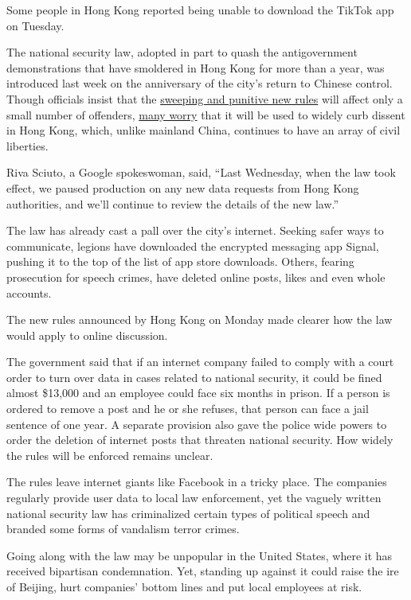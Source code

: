 Some people in Hong Kong reported being unable to download the TikTok
app on Tuesday.

The national security law, adopted in part to quash the antigovernment
demonstrations that have smoldered in Hong Kong for more than a year,
was introduced last week on the anniversary of the city's return to
Chinese control. Though officials insist that the
\href{https://www.nytimes.com/2020/07/02/world/asia/hong-kong-security-china.html}{sweeping
and punitive new rules} will affect only a small number of offenders,
\href{https://www.nytimes.com/2020/07/05/world/asia/hong-kong-security-law.html}{many
worry} that it will be used to widely curb dissent in Hong Kong, which,
unlike mainland China, continues to have an array of civil liberties.

Riva Sciuto, a Google spokeswoman, said, ``Last Wednesday, when the law
took effect, we paused production on any new data requests from Hong
Kong authorities, and we'll continue to review the details of the new
law.''

The law has already cast a pall over the city's internet. Seeking safer
ways to communicate, legions have downloaded the encrypted messaging app
Signal, pushing it to the top of the list of app store downloads.
Others, fearing prosecution for speech crimes, have deleted online
posts, likes and even whole accounts.

The new rules announced by Hong Kong on Monday made clearer how the law
would apply to online discussion.

The government said that if an internet company failed to comply with a
court order to turn over data in cases related to national security, it
could be fined almost \$13,000 and an employee could face six months in
prison. If a person is ordered to remove a post and he or she refuses,
that person can face a jail sentence of one year. A separate provision
also gave the police wide powers to order the deletion of internet posts
that threaten national security. How widely the rules will be enforced
remains unclear.

The rules leave internet giants like Facebook in a tricky place. The
companies regularly provide user data to local law enforcement, yet the
vaguely written national security law has criminalized certain types of
political speech and branded some forms of vandalism terror crimes.

Going along with the law may be unpopular in the United States, where it
has received bipartisan condemnation. Yet, standing up against it could
raise the ire of Beijing, hurt companies' bottom lines and put local
employees at risk.

